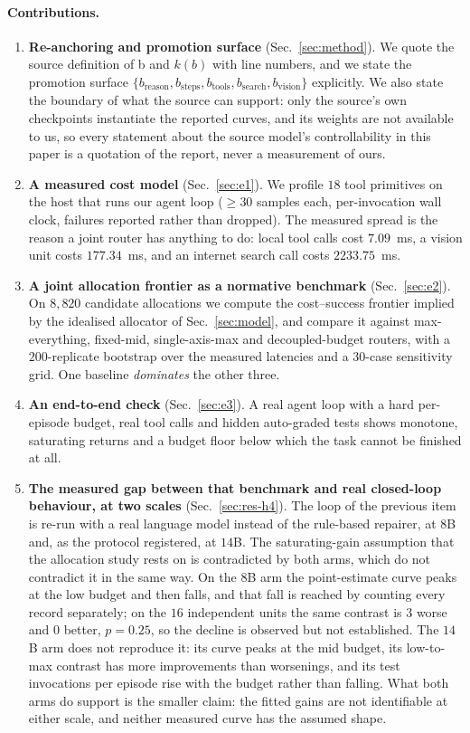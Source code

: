 \documentclass[10pt]{article} %
\newcommand{\eff}{b}
\newcommand{\reff}{\eff_{\mathrm{reason}}}
\newcommand{\stepeff}{\eff_{\mathrm{steps}}}
\newcommand{\tooleff}{\eff_{\mathrm{tools}}}
\newcommand{\searcheff}{\eff_{\mathrm{search}}}
\newcommand{\viseff}{\eff_{\mathrm{vision}}}
\begin{document}
\paragraph{Contributions.}
\begin{enumerate}
\item \textbf{Re-anchoring and promotion surface} (Sec.~\ref{sec:method}). We
  quote the source definition of \eff{} and $k(\eff)$ with line numbers, and we
  state the promotion surface $\{\reff, \stepeff, \tooleff, \searcheff, \viseff\}$ explicitly. We
  also state the boundary of what the source can support: only the source's own
  checkpoints instantiate the reported curves, and its weights are not available
  to us, so every statement about the source model's controllability in this
  paper is a quotation of the report, never a measurement of ours.
\item \textbf{A measured cost model} (Sec.~\ref{sec:e1}). We profile $18$ tool
  primitives on the host that runs our agent loop ($\geq 30$ samples each,
  per-invocation wall clock, failures reported rather than dropped). The
  measured spread is the reason a joint router has anything to do: local tool
  calls cost $7.09$~ms, a vision unit costs $177.34$~ms, and an internet search
  call costs $2233.75$~ms.
\item \textbf{A joint allocation frontier as a normative benchmark} (Sec.~\ref{sec:e2}). On $8{,}820$
  candidate allocations we compute the cost--success frontier implied by the idealised
  allocator of Sec.~\ref{sec:model}, and compare it
  against max-everything, fixed-mid, single-axis-max and decoupled-budget
  routers, with a $200$-replicate bootstrap over the measured latencies and a
  $30$-case sensitivity grid. One baseline \emph{dominates} the other three.
\item \textbf{An end-to-end check} (Sec.~\ref{sec:e3}). A real agent loop with a
  hard per-episode budget, real tool calls and hidden auto-graded tests shows
  monotone, saturating returns and a budget floor below which the task cannot be
  finished at all.
\item \textbf{The measured gap between that benchmark and real closed-loop behaviour, at two
  scales}
  (Sec.~\ref{sec:res-h4}).
  The loop of the previous item is re-run with a real language model instead of
  the rule-based repairer, at $8$B and, as the protocol registered, at $14$B. The
  saturating-gain assumption that the allocation study rests on is contradicted by
  both arms, which do not contradict it in the same way. On the $8$B arm the
  point-estimate curve peaks at the low budget and then falls, and that fall is
  reached by counting every record separately; on the $16$ independent units the same
  contrast is $3$ worse and $0$ better, $p{=}0.25$, so the decline is observed but not
  established. The $14$B arm does not reproduce it: its curve peaks at the mid budget,
  its low-to-max contrast has more improvements than worsenings, and its test
  invocations per episode rise with the budget rather than falling. What both arms do
  support is the smaller claim: the fitted gains are not identifiable at either scale,
  and neither measured curve has the assumed shape.
\end{enumerate}
\end{document}
